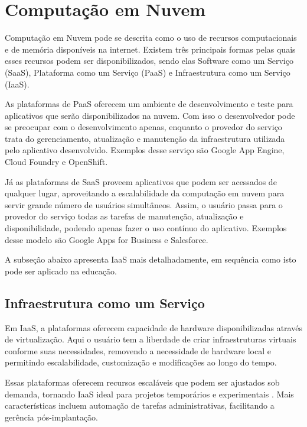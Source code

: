 \documentclass[tg]{mdtufsm}
\begin{document}
\section{Computação em Nuvem}


Computação em Nuvem pode se descrita como o uso de recursos computacionais e de memória disponíveis na internet. Existem três principais formas pelas quais esses recursos podem ser disponibilizados, sendo elas Software como um Serviço (SaaS), Plataforma como um Serviço (PaaS) e Infraestrutura como um Serviço (IaaS).

As plataformas de PaaS oferecem um ambiente de desenvolvimento e teste para aplicativos que serão disponibilizados na nuvem. Com isso o desenvolvedor pode se preocupar com o desenvolvimento apenas, enquanto o provedor do serviço trata do gerenciamento, atualização e manutenção da infraestrutura utilizada pelo aplicativo desenvolvido. Exemplos desse serviço são Google App Engine, Cloud Foundry e OpenShift.

Já as plataformas de SaaS proveem aplicativos que podem ser acessados de qualquer lugar, aproveitando a escalabilidade da computação em nuvem para servir grande número de usuários simultâneos. Assim, o usuário passa para o provedor do serviço todas as tarefas de manutenção, atualização e disponibilidade, podendo apenas fazer o uso contínuo do aplicativo. Exemplos desse modelo são Google Apps for Business e Salesforce.

A subseção abaixo apresenta IaaS mais detalhadamente, em sequência como isto pode ser aplicado na educação.

\subsection{Infraestrutura como um Serviço}

Em IaaS, a plataformas oferecem capacidade de hardware disponibilizadas através de virtualização. Aqui o usuário tem a liberdade de criar infraestruturas virtuais conforme suas necessidades, removendo a necessidade de hardware local e permitindo escalabilidade, customização e modificações ao longo do tempo.

Essas plataformas oferecem recursos escaláveis que podem ser ajustados sob demanda, tornando IaaS ideal para projetos temporários e experimentais \cite{iaas}. Mais características incluem automação de tarefas administrativas, facilitando a gerência pós-implantação.
\end{document}
